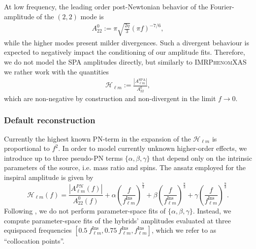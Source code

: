 \documentclass[twocolumn,prd,aps,superscriptaddress,preprintnumbers,tightenlines,showpacs,nofootinbib,eqsecnum,amsfonts,amsmath]{revtex4}
\newcommand{\phX}{\textsc{IMRPhenomXAS}\xspace}
\begin{document}
At low frequency, the
leading order post-Newtonian behavior of the Fourier-amplitude of the $(2,2)$ mode is
\begin{align}\label{eq:AlmScaling}
A_{22}^{0}:= \pi \sqrt{\frac{2\eta}{3}}\left(\pi f\right)^{-7/6},
\end{align} 
while the higher modes present milder divergences. 
Such a divergent behaviour is expected to negatively impact the conditioning of our amplitude fits. Therefore, we do not model the SPA amplitudes directly, but similarly to \phX we rather work with the quantities 
\begin{align}
\mathcal{H}_{\ell m}:=\frac{|A_{\ell m}^{\mathrm{SPA}}|}{A_{22}^0},
\end{align} 
which are non-negative by construction and non-divergent in the limit $f\rightarrow 0$.
\subsubsection{Default reconstruction}
Currently the highest known PN-term in the expansion of the $\mathcal{H}_{\ell m}$ is proportional to $f^{2}$. In order to model currently unknown higher-order effects, we introduce up to three pseudo-PN terms $\{\alpha, \beta, \gamma\}$ that depend only on the intrinsic parameters of the source, i.e. mass ratio and spins. The ansatz employed for the inspiral amplitude is given by 
\begin{equation}
\label{eq:insp_amp}
\mathcal{H}_{\ell m}(f)=\frac{|A_{\ell m}^{PN}(f)|}{A_{22}^0(f)} + \alpha \left(\frac{f}{f^{\mathrm{Ins}}_{\ell m}}\right)^{\frac{7}{3}} + \beta \left(\frac{f}{f^{\mathrm{Ins}}_{\ell m}}\right)^{\frac{8}{3}} + \gamma \left(\frac{f}{f^{\mathrm{Ins}}_{\ell m}}\right)^{\frac{9}{3}}.
\end{equation}  
Following \cite{Khan:2015jqa}, we do not perform parameter-space fits of $\{\alpha, \beta, \gamma\}$.
Instead, we compute parameter-space fits of the hybrids' amplitudes evaluated at three equispaced frequencies  $\left[0.5 \: f_{\ell m}^{\mathrm{Ins}}, 0.75\: f_{\ell m}^{\mathrm{Ins}},f_{\ell m}^{\mathrm{Ins}}\right]$, which we refer to as ``collocation points''.
\end{document}
